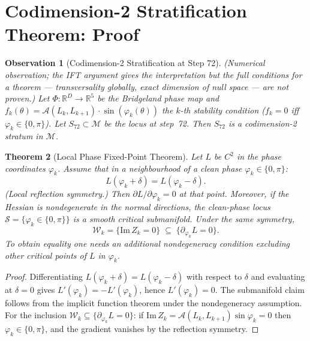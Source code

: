 \documentclass[11pt]{amsart}
\newtheorem{theorem}{Theorem}[section]
\newtheorem{observation}[theorem]{Observation}
\begin{document}
\section{Codimension-2 Stratification Theorem: Proof}
\label{sec:codim2_proof}

\begin{observation}[Codimension-2 Stratification at Step 72]
\label{thm:codim2}
\emph{(Numerical observation; the IFT argument gives the interpretation
but the full conditions for a theorem --- transversality globally,
exact dimension of null space --- are not proven.)}
Let $\Phi: \mathbb{R}^D \to \mathbb{R}^5$ be the Bridgeland phase map
and $f_k(\theta) = \mathcal{A}(L_k, L_{k+1}) \cdot \sin(\varphi_k(\theta))$
the $k$-th stability condition ($f_k = 0$ iff $\varphi_k \in \{0,\pi\}$).
Let $S_{72} \subset \mathcal{M}$ be the locus at step~72.
Then $S_{72}$ is a codimension-2 stratum in $\mathcal{M}$.
\end{observation}

\begin{theorem}[Local Phase Fixed-Point Theorem]
\label{thm:fixed_point}
Let $L$ be $C^2$ in the phase coordinates $\varphi_k$.
Assume that in a neighbourhood of a clean phase $\varphi_k \in \{0,\pi\}$:
\[
  L(\varphi_k + \delta) = L(\varphi_k - \delta).
\]
(Local reflection symmetry.)
Then $\partial L/\partial\varphi_k = 0$ at that point.
Moreover, if the Hessian is nondegenerate in the normal directions,
the clean-phase locus $\mathcal{S} = \{\varphi_k \in \{0,\pi\}\}$
is a smooth critical submanifold.
Under the same symmetry,
\[
  \mathcal{W}_k = \{\mathrm{Im}\,Z_k = 0\}
  \;\subseteq\; \{\partial_{\varphi_k} L = 0\}.
\]
To obtain equality one needs an additional nondegeneracy condition
excluding other critical points of $L$ in $\varphi_k$.
\end{theorem}

\begin{proof}
Differentiating $L(\varphi_k + \delta) = L(\varphi_k - \delta)$
with respect to $\delta$ and evaluating at $\delta = 0$ gives
$L'(\varphi_k) = -L'(\varphi_k)$, hence $L'(\varphi_k) = 0$.
The submanifold claim follows from the implicit function theorem
under the nondegeneracy assumption.
For the inclusion $\mathcal{W}_k \subseteq \{\partial_{\varphi_k}L=0\}$:
if $\mathrm{Im}\,Z_k = \mathcal{A}(L_k,L_{k+1})\sin\varphi_k = 0$
then $\varphi_k \in \{0,\pi\}$, and the gradient vanishes by the
reflection symmetry.
\end{proof}
\end{document}
